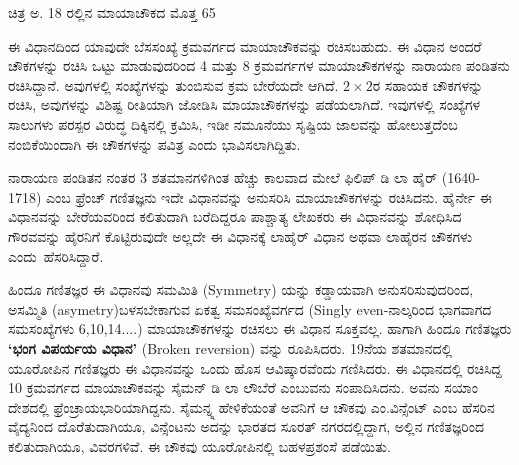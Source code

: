 ಚಿತ್ರ ಅ. 18 ರಲ್ಲಿನ ಮಾಯಾಚೌಕದ ಮೊತ್ತ 65

ಈ ವಿಧಾನದಿಂದ ಯಾವುದೇ ಬೆಸಸಂಖ್ಯೆ ಕ್ರಮವರ್ಗದ ಮಾಯಾಚೌಕವನ್ನು ರಚಿಸ\-ಬಹುದು. ಈ ವಿಧಾನ ಅಂದರೆ ಚೌಕಗಳನ್ನು ರಚಿಸಿ ಒಟ್ಟು ಮಾಡುವುದರಿಂದ 4 ಮತ್ತು 8 ಕ್ರಮ\-ವರ್ಗಗಳ ಮಾಯಾಚೌಕಗಳನ್ನು ನಾರಾಯಣ ಪಂಡಿತನು ರಚಿಸಿದ್ದಾನೆ. ಅವುಗಳಲ್ಲಿ ಸಂಖ್ಯೆ\-ಗಳನ್ನು ತುಂಬಿಸುವ ಕ್ರಮ ಬೇರೆಯದೇ ಆಗಿದೆ. $2 \times 2$ರ ಸಹಾಯಕ ಚೌಕಗಳನ್ನು ರಚಿಸಿ, ಅವುಗಳನ್ನು ವಿಶಿಷ್ಟ ರೀತಿಯಾಗಿ ಜೋಡಿಸಿ ಮಾಯಾಚೌಕಗಳನ್ನು ಪಡೆಯಲಾಗಿದೆ. ಇವುಗಳಲ್ಲಿ ಸಂಖ್ಯೆಗಳ ಸಾಲುಗಳು ಪರಸ್ಪರ ವಿರುದ್ಧ ದಿಕ್ಕಿನಲ್ಲಿ ಕ್ರಮಿಸಿ, ಇಡೀ ನಮೂನೆಯು ಸೃಷ್ಟಿಯ ಜಾಲವನ್ನು ಹೋಲುತ್ತದೆಂಬ ನಂಬಿಕೆಯಿಂದಾಗಿ ಈ ಚೌಕಗಳನ್ನು ಪವಿತ್ರ ಎಂದು ಭಾವಿಸ\-ಲಾಗಿದ್ದಿತು.

ನಾರಾಯಣ ಪಂಡಿತನ ನಂತರ 3 ಶತಮಾನಗಳಿಗಿಂತ ಹೆಚ್ಚು ಕಾಲವಾದ ಮೇಲೆ \linebreak ಫಿಲಿಪ್ ಡಿ ಲಾ ಹೈರ್ (1640-1718) ಎಂಬ ಫ್ರೆಂಚ್ ಗಣಿತಜ್ಞನು ಇದೇ ವಿಧಾನವನ್ನು ಅನುಸರಿಸಿ ಮಾಯಾಚೌಕಗಳನ್ನು ರಚಿಸಿದನು. ಹೈರ್ನೇ ಈ ವಿಧಾನವನ್ನು ಬೇರೆಯವರಿಂದ ಕಲಿತು\-ದಾಗಿ ಬರೆದಿದ್ದರೂ ಪಾಶ್ಚಾತ್ಯ ಲೇಖಕರು ಈ ವಿಧಾನವನ್ನು ಶೋಧಿಸಿದ ಗೌರವವನ್ನು ಹೈರ\-ನಿಗೆ ಕೊಟ್ಟಿರುವುದೇ ಅಲ್ಲದೇ ಈ ವಿಧಾನಕ್ಕೆ ಲಾಹೈರ್ ವಿಧಾನ ಅಥವಾ ಲಾಹೈರನ ಚೌಕಗಳು \hbox{ಎಂದು ಹೆಸರಿಸಿದ್ದಾರೆ.}

ಹಿಂದೂ ಗಣಿತಜ್ಞರ ಈ ವಿಧಾನವು ಸಮಮಿತಿ (Symmetry) ಯನ್ನು ಕಡ್ಡಾಯವಾಗಿ ಅನುಸರಿಸುವುದರಿಂದ, ಅಸಮ್ಮಿತಿ (asymetry)ಬಳಸಬೇಕಾಗುವ ಏಕತ್ವ ಸಮಸಂಖ್ಯೆ\-ವರ್ಗದ (Singly even-ನಾಲ್ಕರಿಂದ ಭಾಗವಾಗದ ಸಮಸಂಖ್ಯೆಗಳು 6,10,14....) ಮಾಯಾ\-ಚೌಕಗಳನ್ನು ರಚಿಸಲು ಈ ವಿಧಾನ ಸೂಕ್ತವಲ್ಲ. ಹಾಗಾಗಿ ಹಿಂದೂ ಗಣಿತಜ್ಞರು \textbf{‘ಭಂಗ ವಿಪರ್ಯಯ ವಿಧಾನ’} (Broken reversion) ವನ್ನು ರೂಪಿಸಿದರು. 19ನೆಯ ಶತಮಾನದಲ್ಲಿ ಯೂರೋಪಿನ ಗಣಿತಜ್ಞರು ಈ ವಿಧಾನವನ್ನು ಒಂದು ಹೊಸ ಆವಿಷ್ಕಾರವೆಂದು ಗಣಿಸಿದರು. ಈ ವಿಧಾನದಲ್ಲಿ  ರಚಿಸಿದ್ದ 10 ಕ್ರಮವರ್ಗದ ಮಾಯಾಚೌಕವನ್ನು ಸೈಮನ್ ಡಿ ಲಾ ಲೌಬೆರೆ \break ಎಂಬುವನು ಸಂಪಾದಿಸಿದನು. ಅವನು ಸಯಾಂ ದೇಶದಲ್ಲಿ ಫ್ರೆಂಚ್ರಾಯಭಾರಿಯಾಗಿದ್ದನು. ಸೈಮನ್ನ್ನ ಹೇಳಿಕೆಯಂತೆ ಅವನಿಗೆ ಆ ಚೌಕವು ಎಂ.ವಿನ್ಸೆಂಟ್ ಎಂಬ ಹೆಸರಿನ ವೈದ್ಯನಿಂದ ದೊರೆತು\-ದಾಗಿಯೂ, ವಿನ್ಸೆಂಟನು ಅದನ್ನು ಭಾರತದ ಸೂರತ್ ನಗರದಲ್ಲಿದ್ದಾಗ, ಅಲ್ಲಿನ \hbox{ಗಣಿತಜ್ಞರಿಂದ} ಕಲಿತುದಾಗಿಯೂ, ವಿವರಗಳಿವೆ. ಈ ಚೌಕವು ಯೂರೋಪಿನಲ್ಲಿ ಬಹಳ\break  ಪ್ರಶಂಸೆ ಪಡೆಯಿತು.

